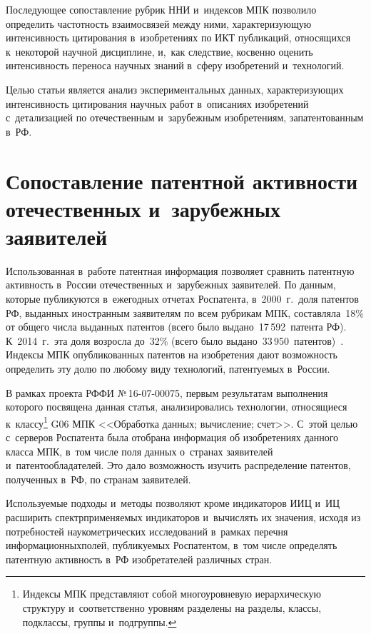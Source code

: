 \begin{multicols}{2}
  Последующее сопоставление рубрик ННИ и~индексов МПК позволило 
определить частотность взаимосвязей между ними, характеризующую 
интенсивность цитирования в~изобретениях по ИКТ пуб\-ли\-ка\-ций, относящихся 
к~некоторой научной дисциплине, и,~как следствие, косвенно оценить 
интенсивность переноса научных знаний в~сферу изобретений и~технологий.
  
  Целью статьи является анализ экспериментальных данных, характеризующих 
интенсивность цитирования научных работ в~описаниях изобретений 
с~детализацией по отечественным и~зарубежным изобретениям, запатентованным 
в~РФ.

\vspace*{-9pt}
  
\section{Сопоставление патентной активности отечественных 
и~зарубежных заявителей}
  
  Использованная в~работе патентная информация позволяет сравнить патентную 
активность в~России отечественных и~зарубежных заявителей. По данным, 
которые пуб\-ли\-ку\-ют\-ся в~ежегодных отчетах Роспатента, в~2000~г.\ доля патентов 
РФ, выданных иностранным заявителям по всем рубрикам МПК, 
составляла~18\% от общего числа выданных патентов (всего было 
выдано~17\,592~патента РФ).\linebreak
 К~2014~г.\ эта доля возросла до~32\% (всего было\linebreak 
выдано~33\,950~патентов)~\cite{27-min, 28-min}. Индексы МПК опуб\-ли\-ко\-ван\-ных 
патентов на изобретения дают возможность определить эту долю по любому виду 
технологий, патентуемых в~России.
  
  В рамках проекта РФФИ №\,16-07-00075, первым результатам выполнения 
которого посвящена данная статья, анализировались технологии, относящиеся 
к~классу\footnote{Индексы МПК представляют собой многоуровневую иерархическую 
структуру и~соответственно уровням разделены на разделы, классы, подклассы, группы 
и~подгруппы.} G06 МПК <<Обработка данных; вычисление; счет>>. С~этой целью 
с~серверов Роспатента была отобрана информация об изобретениях данного 
класса МПК, в~том числе поля данных о~странах заявителей 
и~патентообладателей. Это дало возможность изучить распределение патентов, 
полученных в~РФ, по странам заявителей.
  
  Используемые подходы и~методы позволяют кроме индикаторов ИИЦ и~ИЦ 
расширить спектр\linebreak применяемых индикаторов и~вычислять их значения, исходя из 
потребностей наукометрических исследований в~рамках перечня 
информационных\linebreak полей, публикуемых Роспатентом, в~том числе определять 
патентную активность в~РФ изобретателей различных стран.
  

\end{multicols}
